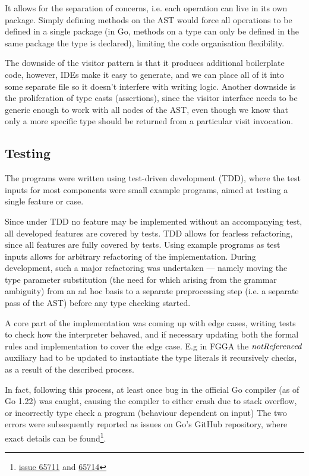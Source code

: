 It allows for the separation of concerns, i.e. each operation can live in its
own package. Simply defining methods on the AST would force all operations to be
defined in a single package (in Go, methods on a type can only be defined in the
same package the type is declared), limiting the code organisation flexibility.

The downside of the visitor pattern is that it produces additional boilerplate
code, however, IDEs make it easy to generate, and we can place all of it into
some separate file so it doesn't interfere with writing logic. Another downside
is the proliferation of type casts (assertions), since the visitor interface
needs to be generic enough to work with all nodes of the AST, even though we
know that only a more specific type should be returned from a particular visit
invocation.

\subsection{Testing}

The programs were written using test-driven development (TDD), where the test
inputs for most components were small example programs, aimed at testing a
single feature or case.

Since under TDD no feature may be implemented without an accompanying test, all
developed features are covered by tests. TDD allows for fearless refactoring,
since all features are fully covered by tests. Using example programs as test
inputs allows for arbitrary refactoring of the implementation. During
development, such a major refactoring was undertaken --- namely moving the type parameter
substitution (the need for which arising from the grammar ambiguity) from an ad
hoc basis to a separate preprocessing step (i.e. a separate pass of the AST)
before any type checking started.

A core part of the implementation was coming up with edge cases, writing tests
to check how the interpreter behaved, and if necessary updating both the formal
rules and implementation to cover the edge case. E.g in FGGA the $\mathit{notReferenced}$
auxiliary had to be updated to instantiate the type literals it recursively
checks, as a result of the described process.

In fact, following this process, at least once bug in the official Go compiler
(as of Go 1.22) was caught, causing the compiler to either crash due to stack
overflow, or incorrectly type check a program (behaviour dependent on input) The
two errors were subsequently reported as issues on Go's GitHub repository, where
exact details can be
found\footnote{\href{https://github.com/golang/go/issues/65711}{issue 65711} and
    \href{https://github.com/golang/go/issues/65714}{65714}}.

%
